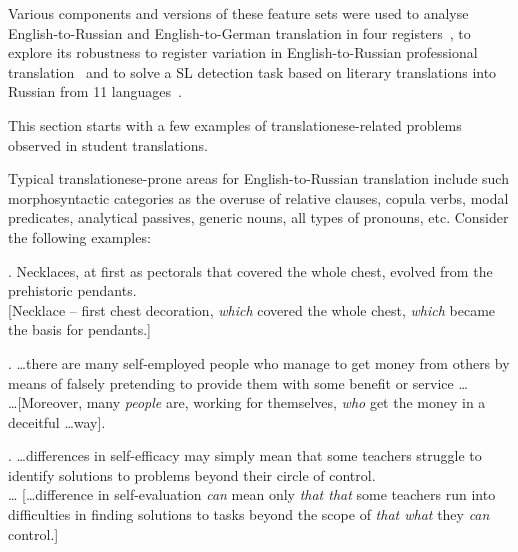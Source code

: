 Various components and versions of these feature sets were used to analyse English-to-Russian and English-to-German translation in four registers~\cite{Kunilovskaya2020vars}, to explore its robustness to register variation in English-to-Russian professional translation~\cite{Kunilovskaya2021regs} and to solve a SL detection task based on literary translations into Russian from 11 languages~\cite{Kunilovskaya2021ranlp}.

This section starts with a few examples of translationese-related problems observed in student translations.

Typical translationese-prone areas for English-to-Russian translation include such morphosyntactic categories as the overuse of relative clauses, copula verbs, modal predicates, analytical passives, generic nouns, all types of pronouns, etc. Consider the following examples:


\ex. \label{ex:functionw}\hspace{1pt}
Necklaces, at ﬁrst as pectorals that covered the whole chest, evolved from the prehistoric pendants.\\
 [Necklace -- ﬁrst chest decoration, \textit{which} covered the whole chest, \textit{which} became the basis for pendants.]

\ex. \label{ex:generic}\hspace{1pt}
\dots there are many self-employed people who manage to get money from others by means
of falsely pretending to provide them with some benefit or service \dots \\
  \dots [Moreover, many \textit{people} are, working for themselves, \textit{who} get the money in a deceitful  \dots way].

\ex. \label{ex:modalp}\hspace{1pt}
\dots differences in self-efficacy may simply mean that some teachers struggle to identify
solutions to problems beyond their circle of control. \\
\dots {} [\dots difference in self-evaluation \textit{can} mean only \textit{that that} some teachers run into difficulties in finding solutions to tasks beyond the scope of \textit{that what} they \textit{can} control.]

